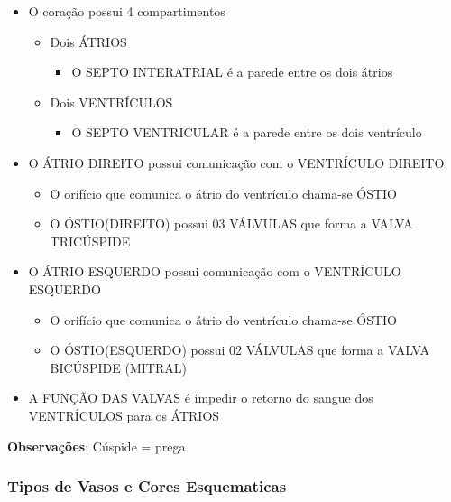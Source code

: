 \documentclass[
]{book}
\providecommand{\tightlist}{%
  \setlength{\itemsep}{0pt}\setlength{\parskip}{0pt}}
\begin{document}
\begin{itemize}
\tightlist
\item
  O coração possui 4 compartimentos

  \begin{itemize}
  \tightlist
  \item
    Dois ÁTRIOS

    \begin{itemize}
    \tightlist
    \item
      O SEPTO INTERATRIAL é a parede entre os dois átrios
    \end{itemize}
  \item
    Dois VENTRÍCULOS

    \begin{itemize}
    \tightlist
    \item
      O SEPTO VENTRICULAR é a parede entre os dois ventrículo
    \end{itemize}
  \end{itemize}
\item
  O ÁTRIO DIREITO possui comunicação com o VENTRÍCULO DIREITO

  \begin{itemize}
  \tightlist
  \item
    O orifício que comunica o átrio do ventrículo chama-se ÓSTIO
  \item
    O ÓSTIO(DIREITO) possui 03 VÁLVULAS que forma a VALVA TRICÚSPIDE
  \end{itemize}
\item
  O ÁTRIO ESQUERDO possui comunicação com o VENTRÍCULO ESQUERDO

  \begin{itemize}
  \tightlist
  \item
    O orifício que comunica o átrio do ventrículo chama-se ÓSTIO
  \item
    O ÓSTIO(ESQUERDO) possui 02 VÁLVULAS que forma a VALVA BICÚSPIDE (MITRAL)
  \end{itemize}
\item
  A FUNÇÃO DAS VALVAS é impedir o retorno do sangue dos VENTRÍCULOS para os ÁTRIOS
\end{itemize}

\textbf{Observações}: Cúspide = prega

\hypertarget{tipos-de-vasos-e-cores-esquematicas}{%
\subsubsection{Tipos de Vasos e Cores Esquematicas}\label{tipos-de-vasos-e-cores-esquematicas}}
\end{document}
